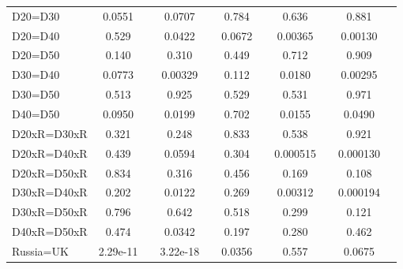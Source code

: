 \begin{tabular}{l|cccccc|cc|cc}
D20=D30         &   0.0551         &         &   0.0707         &         &    0.784         &         &    0.636         &         &    0.881         &         \\
D20=D40         &    0.529         &         &   0.0422         &         &   0.0672         &         &  0.00365         &         &  0.00130         &         \\
D20=D50         &    0.140         &         &    0.310         &         &    0.449         &         &    0.712         &         &    0.909         &         \\
D30=D40         &   0.0773         &         &  0.00329         &         &    0.112         &         &   0.0180         &         &  0.00295         &         \\
D30=D50         &    0.513         &         &    0.925         &         &    0.529         &         &    0.531         &         &    0.971         &         \\
D40=D50         &   0.0950         &         &   0.0199         &         &    0.702         &         &   0.0155         &         &   0.0490         &         \\
D20xR=D30xR     &    0.321         &         &    0.248         &         &    0.833         &         &    0.538         &         &    0.921         &         \\
D20xR=D40xR     &    0.439         &         &   0.0594         &         &    0.304         &         & 0.000515         &         & 0.000130         &         \\
D20xR=D50xR     &    0.834         &         &    0.316         &         &    0.456         &         &    0.169         &         &    0.108         &         \\
D30xR=D40xR     &    0.202         &         &   0.0122         &         &    0.269         &         &  0.00312         &         & 0.000194         &         \\
D30xR=D50xR     &    0.796         &         &    0.642         &         &    0.518         &         &    0.299         &         &    0.121         &         \\
D40xR=D50xR     &    0.474         &         &   0.0342         &         &    0.197         &         &    0.280         &         &    0.462         &         \\
Russia=UK       & 2.29e-11         &         & 3.22e-18         &         &   0.0356         &         &    0.557         &         &   0.0675         &         \\

\end{tabular}
